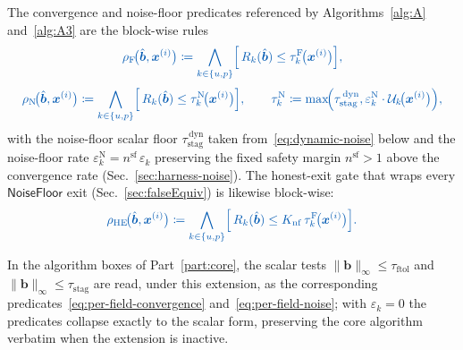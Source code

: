 \documentclass{article}
\newcommand{\textftol}{\tau_{\mathrm{ftol}}}
\newcommand{\textstag}{\tau_{\mathrm{stag}}}
\newcommand{\extline}[1]{{\color{extcolor}#1}}
\begin{document}
\extline{The convergence and noise-floor predicates referenced by
Algorithms~\ref{alg:A} and~\ref{alg:A3} are the block-wise rules}
\begin{equation}
    \label{eq:per-field-convergence}
    \textcolor{extcolor}{
    \rho_{\mathrm{F}}\!\bigl(\hat{\boldsymbol{b}}, \boldsymbol{x}^{(i)}\bigr)
        \coloneqq \bigwedge_{k \in \{u,p\}}
            \Bigl[\,R_{k}(\hat{\boldsymbol{b}})
                \le \tau^{\mathrm{F}}_{k}\!\bigl(\boldsymbol{x}^{(i)}\bigr)\Bigr],
    }
\end{equation}
\begin{equation}
    \label{eq:per-field-noise}
    \textcolor{extcolor}{
    \rho_{\mathrm{N}}\!\bigl(\hat{\boldsymbol{b}}, \boldsymbol{x}^{(i)}\bigr)
        \coloneqq \bigwedge_{k \in \{u,p\}}
            \Bigl[\,R_{k}(\hat{\boldsymbol{b}})
                \le \tau^{\mathrm{N}}_{k}\!\bigl(\boldsymbol{x}^{(i)}\bigr)\Bigr],
        \qquad \tau^{\mathrm{N}}_{k} \coloneqq \max\!\Bigl(\textstag^{\,\mathrm{dyn}},
        \varepsilon_{k}^{\mathrm{N}} \cdot \mathcal{U}_{k}\!\bigl(\boldsymbol{x}^{(i)}\bigr)\Bigr),}
\end{equation}
\extline{with the noise-floor scalar floor $\textstag^{\,\mathrm{dyn}}$
taken from~\eqref{eq:dynamic-noise} below and the noise-floor rate
$\varepsilon_{k}^{\mathrm{N}} = n^{\mathrm{sf}}\,\varepsilon_{k}$
preserving the fixed safety margin $n^{\mathrm{sf}} > 1$ above the
convergence rate (Sec.~\ref{sec:harness-noise}). The honest-exit
gate that wraps every $\mathsf{NoiseFloor}$ exit
(Sec.~\ref{sec:falseEquiv}) is likewise block-wise:}
\begin{equation}
    \label{eq:per-field-honest}
    \textcolor{extcolor}{
    \rho_{\mathrm{HE}}\!\bigl(\hat{\boldsymbol{b}}, \boldsymbol{x}^{(i)}\bigr)
        \coloneqq \bigwedge_{k \in \{u,p\}}
            \Bigl[\,R_{k}(\hat{\boldsymbol{b}})
                \le K_{\mathrm{nf}}\, \tau^{\mathrm{F}}_{k}\!\bigl(\boldsymbol{x}^{(i)}\bigr)\Bigr].}
\end{equation}

\extline{In the algorithm boxes of Part~\ref{part:core}, the scalar
tests $\|\boldsymbol{b}\|_{\infty}\le \textftol$ and
$\|\boldsymbol{b}\|_{\infty}\le \textstag$ are read, under this
extension, as the corresponding predicates~\eqref{eq:per-field-convergence}
and~\eqref{eq:per-field-noise}; with $\varepsilon_{k} = 0$ the
predicates collapse exactly to the scalar form, preserving the core
algorithm verbatim when the extension is inactive.}
\end{document}
